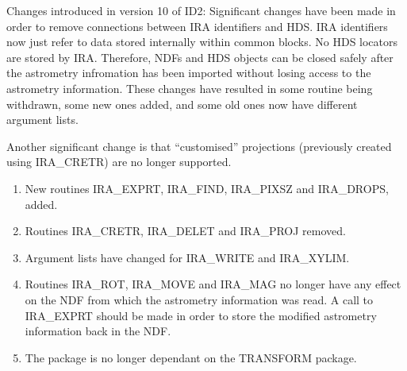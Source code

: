 Changes introduced in version 10 of ID2:
Significant changes have been made in order to remove connections between
IRA identifiers and HDS. IRA identifiers now just refer to data stored
internally within common blocks. No HDS locators are stored by IRA. Therefore,
NDFs and HDS objects can be closed safely after the astrometry infromation has
been imported without losing access to the astrometry information. These
changes have resulted in some routine being withdrawn, some new ones added, and
some old ones now have different argument lists.

Another significant change is that ``customised'' projections (previously
created using IRA\_CRETR) are no longer supported.

\begin{enumerate}
\item New routines IRA\_EXPRT, IRA\_FIND, IRA\_PIXSZ and IRA\_DROPS, added.
\item Routines IRA\_CRETR, IRA\_DELET and IRA\_PROJ removed.
\item Argument lists have changed for IRA\_WRITE and IRA\_XYLIM.
\item Routines IRA\_ROT, IRA\_MOVE and IRA\_MAG no longer have any effect on the
NDF from which the astrometry information was read. A call to IRA\_EXPRT should
be made in order to store the modified astrometry information back in the NDF.
\item The package is no longer dependant on the TRANSFORM package.
\end{enumerate}

